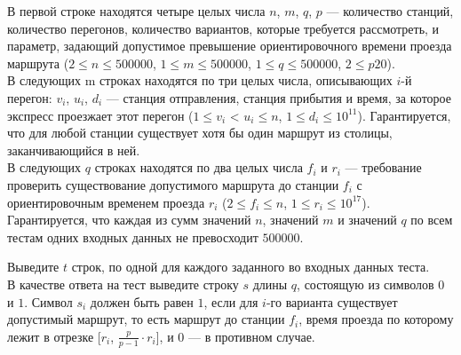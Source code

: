 \begin{problem}
В первой строке находятся четыре целых числа $n$, $m$, $q$, $p$ — количество станций, количество перегонов, количество вариантов, которые требуется рассмотреть, и параметр, задающий допустимое превышение ориентировочного времени проезда маршрута ($2 \le n \le 500000$, $1 \le m \le 500000$, $1 \le q \le 500000$, $2 \le p 20$).\\

В следующих m строках находятся по три целых числа, описывающих $i$-й перегон: $v_i$, $u_i$, $d_i$ — станция отправления, станция прибытия и время, за которое экспресс проезжает этот перегон ($1 \le v_i$ < $u_i \le n$, $1 \le d_i \le 10^{11}$). Гарантируется, что для любой станции существует хотя бы один маршрут из столицы, заканчивающийся в ней.\\

В следующих $q$ строках находятся по два целых числа $f_i$ и $r_i$ — требование проверить существование допустимого маршрута до станции $f_i$ с ориентировочным временем проезда $r_i$ ($2 \le f_i \le n$, $1 \le r_i \le 10^{17}$).\\

Гарантируется, что каждая из сумм значений $n$, значений $m$ и значений $q$ по всем тестам одних входных данных не превосходит $500000$.

\OutputFile

Выведите $t$ строк, по одной для каждого заданного во входных данных теста.\\

В качестве ответа на тест выведите строку $s$ длины $q$, состоящую из символов $0$ и $1$. Символ $s_i$ должен быть равен $1$, если для $i$-го варианта существует допустимый маршрут, то есть маршрут до станции $f_i$, время проезда по которому лежит в отрезке [$r_i$, $\frac{p}{p-1} \cdot r_i$], и $0$ — в противном случае.

\Examples

\begin{example}
%
%
\end{example}
\end{problem}
